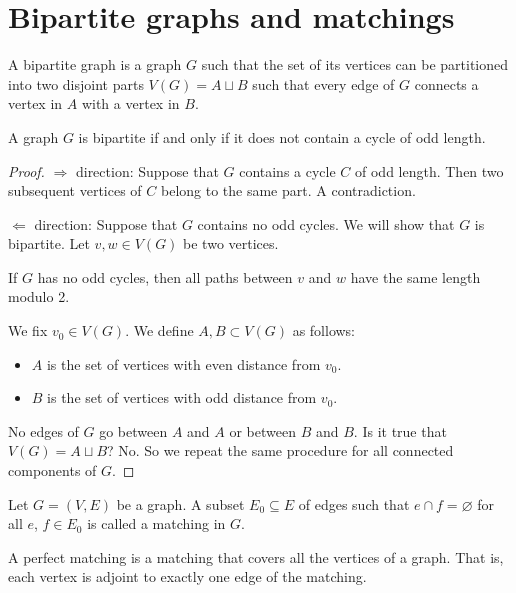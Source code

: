 \section{Bipartite graphs and matchings}
\begin{definition}
A bipartite graph is a graph $G$ such that the set of its vertices can be partitioned into two disjoint parts $V(G)=A\sqcup B$ such that every edge of $G$ connects a vertex in $A$ with a vertex in $B$. 
\end{definition}
\begin{lemma}
A graph $G$ is bipartite if and only if it does not contain a cycle of odd length.
\end{lemma}
\begin{proof}
$\Rightarrow$ direction: Suppose that $G$ contains a cycle $C$ of odd length. Then two subsequent vertices of $C$ belong to the same part. A contradiction.

$\Leftarrow$ direction: Suppose that $G$ contains no odd cycles. We will show that $G$ is bipartite. Let $v,w\in V(G)$ be two vertices. 
\begin{claim}
If $G$ has no odd cycles, then all paths between $v$ and $w$ have the same length modulo 2. 
\end{claim}
We fix $v_{0}\in V(G)$. We define $A,B\subset V(G)$ as follows:
\begin{itemize}
\item $A$ is the set of vertices with even distance from $v_{0}$.
\item $B$ is the set of vertices with odd distance from $v_{0}$.
\end{itemize}
No edges of $G$ go between $A$ and $A$ or between $B$ and $B$. Is it true that $V(G)=A\sqcup B$? No. So we repeat the same procedure for all connected components of $G$. 
\end{proof}
\begin{definition}
Let $G=(V,E)$ be a graph. A subset $E_{0}\subseteq E$ of edges such that $e\cap f=\varnothing$ for all $e$, $f\in E_{0}$ is called a matching in $G$.
\end{definition}
\begin{definition}
A perfect matching is a matching that covers all the vertices of a graph. That is, each vertex is adjoint to exactly one edge of the matching.
\end{definition}

